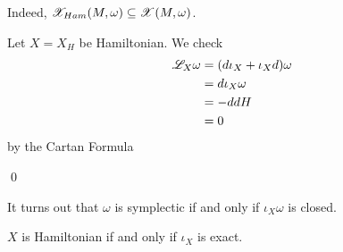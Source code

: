 \documentclass[x11names,reqno,14pt]{extarticle}
\begin{document}
\prop Indeed, $\mathscr{X}_{Ham}(M,\omega) \subseteq \mathscr{X}(M,\omega)$.

\proof

Let $X = X_H$ be Hamiltonian. We check 
\begin{align*}
\mathscr{L}_X\omega & = (d\iota_X + \iota_Xd)\omega \\
& = d\iota_X\omega \\ 
& = -ddH \\
& = 0\\
\end{align*}
by the Cartan Formula

\qed

It turns out that $\omega$ is symplectic if and only if $\iota_X\omega$ is closed. 

$X$ is Hamiltonian if and only if $\iota_X$ is exact. 
\end{document}
